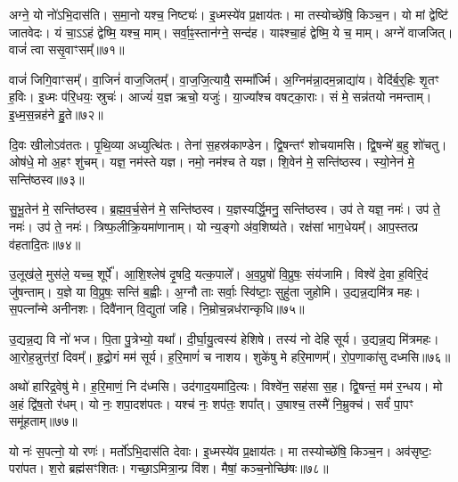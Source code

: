 अग्ने॒ यो नो॑\-ऽभि॒दास॑ति।
स॒मा॒नो यश्च॒ निष्ट्यः॑।
इ॒ध्मस्ये॑व प्र॒क्षाय॑तः।
मा तस्योच्छे॑षि॒ किञ्च॒न।
यो मां द्वेष्टि॑ जातवेदः।
यं चा॒ऽऽहं द्वेष्मि॒ यश्च॒ माम्।
सर्वा॒ꣴ॒स्तान॑ग्ने॒ सन्द॑ह।
याꣴश्चा॒हं द्वेष्मि॒ ये च॒ माम्।
अग्ने॑ वाजजित्।
वाजं॑ त्वा ससृ॒वाꣳसम्᳚॥७१॥

वाजं॑ जिगि॒वाꣳसम्᳚।
वा॒जिनं॑ वाज॒जितम्᳚।
वा॒ज॒जि॒त्यायै॒ सम्मा᳚र्ज्मि।
अ॒ग्निम॑न्ना॒दम॒न्नाद्या॑य।
वेदि॑र्ब॒र्॒हिः शृ॒तꣳ ह॒विः।
इ॒ध्मः प॑रि॒धयः॒ स्रुचः॑।
आज्यं॑ य॒ज्ञ ऋचो॒ यजुः॑।
या॒ज्या᳚श्च वषट्का॒राः।
सं मे॒ सन्न॑तयो नमन्ताम्।
इ॒ध्म॒स॒न्नह॑ने हु॒ते॥७२॥

दि॒वः खीलो\-ऽव॑ततः।
पृ॒थि॒व्या अध्युत्थि॑तः।
तेना॑ स॒हस्र॑काण्डेन।
द्वि॒षन्तꣳ॑ शोचयामसि।
द्वि॒षन्मे॑ ब॒हु शो॑चतु।
ओष॑धे॒ मो अ॒हꣳ शु॑चम्।
यज्ञ॒ नम॑स्ते यज्ञ।
नमो॒ नम॑श्च ते यज्ञ।
शि॒वेन॑ मे॒ सन्ति॑ष्ठस्व।
स्यो॒नेन॑ मे॒ सन्ति॑ष्ठस्व॥७३॥

सु॒भू॒तेन॑ मे॒ सन्ति॑ष्ठस्व।
ब्र॒ह्म॒व॒र्च॒सेन॑ मे॒ सन्ति॑ष्ठस्व।
य॒ज्ञस्यर्द्धि॒मनु॒ सन्ति॑ष्ठस्व।
उप॑ ते यज्ञ॒ नमः॑।
उप॑ ते॒ नमः॑।
उप॑ ते॒ नमः॑।
त्रिष्फ॒लीक्रि॒यमा॑णानाम्।
यो न्य॒ङ्गो अ॑व॒शिष्य॑ते।
रक्ष॑सां भाग॒धेयम्᳚।
आप॒स्तत्प्र व॑हतादि॒तः॥७४॥

उ॒लूख॑ले॒ मुस॑ले॒ यच्च॒ शूर्पे᳚।
आ॒शि॒श्लेष॑ दृ॒षदि॒ यत्क॒पाले᳚।
अ॒व॒प्रुषो॑ वि॒प्रुषः॒ संय॑जामि।
विश्वे॑ दे॒वा ह॒विरि॒दं जु॑षन्ताम्।
य॒ज्ञे या वि॒प्रुषः॒ सन्ति॑ ब॒ह्वीः।
अ॒ग्नौ ताः सर्वाः॒ स्वि॑ष्टाः॒ सुहु॑ता जुहोमि।
उ॒द्यन्न॒द्यमि॑त्र महः।
स॒पत्ना᳚न्मे अनीनशः।
दिवै॑नान् वि॒द्युता॑ जहि।
नि॒म्रोच॒न्नध॑रान्कृधि॥७५॥

उ॒द्यन्न॒द्य वि नो॑ भज।
पि॒ता पु॒त्रेभ्यो॒ यथा᳚।
दी॒र्घा॒यु॒त्वस्य॑ हेशिषे।
तस्य॑ नो देहि सूर्य।
उ॒द्यन्न॒द्य मि॑त्रमहः।
आ॒रोह॒न्नुत्त॑रां॒ दिवम्᳚।
हृ॒द्रो॒गं मम॑ सूर्य।
ह॒रि॒माणं॑ च नाशय।
शुके॑षु मे हरि॒माणम्᳚।
रो॒प॒णाका॑सु दध्मसि॥७६॥

अथो॑ हारिद्र॒वेषु॑ मे।
ह॒रि॒माणं॒ नि द॑ध्मसि।
उद॑गाद॒यमा॑दि॒त्यः।
विश्वे॑न॒ सह॑सा स॒ह।
द्वि॒षन्तं॒ मम॑ र॒न्धय\sn{}।
मो अ॒हं द्वि॑ष॒तो र॑धम्।
यो नः॒ शपा॒दश॑पतः।
यश्च॑ नः॒ शप॑तः॒ शपा᳚त्।
उ॒षाश्च॒ तस्मै॑ नि॒म्रुक्च॑।
सर्वं॑ पा॒पꣳ समू॑हताम्॥७७॥

यो नः॑ स॒पत्नो॒ यो रणः॑।
मर्तो॑\-ऽभि॒दास॑ति देवाः।
इ॒ध्मस्ये॑व प्र॒क्षाय॑तः।
मा तस्योच्छे॑षि॒ किञ्च॒न।
अव॑सृष्टः॒ परा॑पत।
श॒रो ब्रह्म॑सꣳशितः।
गच्छा॒\-ऽमित्रा॒न्प्र वि॑श।
मैषां॒ कञ्च॒नोच्छि॑षः॥७८॥


